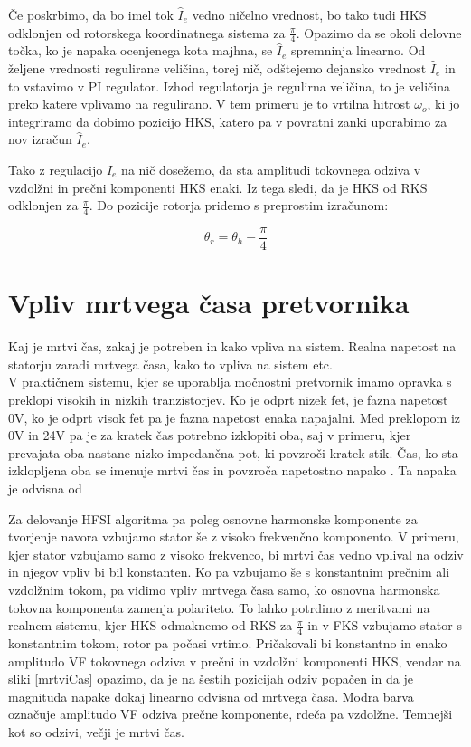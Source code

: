 \documentclass[a4paper,twoside,openright,12pt,slovene]{book}
\begin{document}
Če poskrbimo, da bo imel tok $\hat{I}_{e}$ vedno ničelno vrednost, bo tako tudi HKS odklonjen od rotorskega koordinatnega sistema za $\frac{\pi}{4}$. Opazimo da se okoli delovne točka, ko je napaka
ocenjenega kota majhna, se $\hat{I}_{e}$ spremninja linearno. Od željene vrednosti regulirane veličina, torej nič, odštejemo dejansko vrednost $\hat{I}_{e}$ in to vstavimo v PI regulator. Izhod
regulatorja je regulirna veličina, to je veličina preko katere vplivamo na regulirano. V tem primeru je to vrtilna hitrost $\omega_o$, ki jo integriramo da dobimo pozicijo HKS, katero pa v povratni zanki
uporabimo za nov izračun $\hat{I}_{e}$. 

Tako z regulacijo $\hat{I}_{e}$ na nič dosežemo, da sta amplitudi tokovnega odziva v vzdolžni in prečni komponenti HKS enaki. Iz tega sledi, da je HKS od RKS odklonjen za $\frac{\pi}{4}$. Do pozicije
rotorja pridemo s preprostim izračunom:

\begin{equation}
    \theta_{r} = \theta_{h} - \frac{\pi}{4}
\end{equation}

\section{Vpliv mrtvega časa pretvornika}
Kaj je mrtvi čas, zakaj je potreben in kako vpliva na sistem. Realna napetost na statorju zaradi mrtvega časa, kako to vpliva na sistem etc. 
\\
V praktičnem sistemu, kjer se uporablja močnostni pretvornik imamo opravka s preklopi visokih in nizkih tranzistorjev. Ko je odprt nizek fet, je fazna napetost 0V, ko je odprt visok fet pa je fazna
napetost enaka napajalni. Med preklopom iz 0V in 24V pa je za kratek čas potrebno izklopiti oba, saj v primeru, kjer prevajata oba nastane nizko-impedančna pot, ki povzroči kratek stik. Čas, ko sta
izklopljena oba se imenuje mrtvi čas in povzroča napetostno napako \cite{ambrovzivc2016elektrivcni}. Ta napaka je odvisna od 

Za delovanje HFSI algoritma pa poleg osnovne harmonske komponente za tvorjenje navora vzbujamo stator še z visoko frekvenčno komponento. V primeru, kjer stator vzbujamo samo z visoko frekvenco, bi
mrtvi čas vedno vplival na odziv in njegov vpliv bi bil konstanten. Ko pa vzbujamo še s konstantnim prečnim ali vzdolžnim tokom, pa vidimo vpliv mrtvega časa samo, ko osnovna harmonska tokovna komponenta
zamenja polariteto. To lahko potrdimo z meritvami na realnem sistemu, kjer HKS odmaknemo od RKS za $\frac{\pi}{4}$ in v FKS vzbujamo stator s konstantnim tokom, rotor pa počasi vrtimo. Pričakovali bi
konstantno in enako amplitudo VF tokovnega odziva v prečni in vzdolžni komponenti HKS, vendar na sliki \ref{mrtviCas} opazimo, da je na šestih pozicijah odziv popačen in da je magnituda napake dokaj linearno odvisna
od mrtvega časa. Modra barva označuje amplitudo VF odziva prečne komponente, rdeča pa vzdolžne. Temnejši kot so odzivi, večji je mrtvi čas. 
\end{document}
